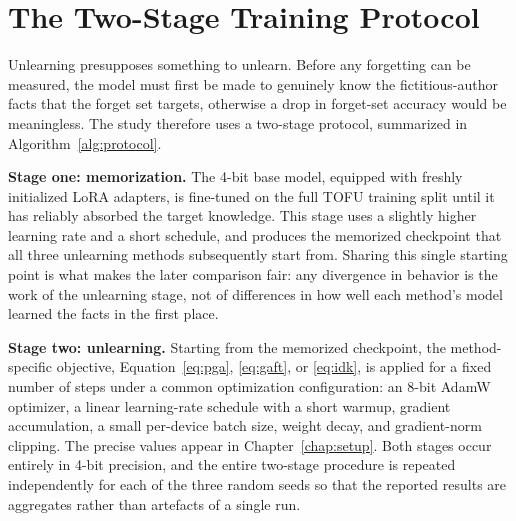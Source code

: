 \documentclass[a4paper,12pt]{report}
\begin{document}
\section{The Two-Stage Training Protocol}
Unlearning presupposes something to unlearn. Before any forgetting can be measured, the model must first be made to genuinely know the fictitious-author facts that the forget set targets, otherwise a drop in forget-set accuracy would be meaningless. The study therefore uses a two-stage protocol, summarized in Algorithm~\ref{alg:protocol}.

\textbf{Stage one: memorization.} The 4-bit base model, equipped with freshly initialized LoRA adapters, is fine-tuned on the full TOFU training split until it has reliably absorbed the target knowledge. This stage uses a slightly higher learning rate and a short schedule, and produces the memorized checkpoint that all three unlearning methods subsequently start from. Sharing this single starting point is what makes the later comparison fair: any divergence in behavior is the work of the unlearning stage, not of differences in how well each method's model learned the facts in the first place.

\textbf{Stage two: unlearning.} Starting from the memorized checkpoint, the method-specific objective, Equation~\eqref{eq:pga}, \eqref{eq:gaft}, or \eqref{eq:idk}, is applied for a fixed number of steps under a common optimization configuration: an 8-bit AdamW optimizer, a linear learning-rate schedule with a short warmup, gradient accumulation, a small per-device batch size, weight decay, and gradient-norm clipping. The precise values appear in Chapter~\ref{chap:setup}. Both stages occur entirely in 4-bit precision, and the entire two-stage procedure is repeated independently for each of the three random seeds so that the reported results are aggregates rather than artefacts of a single run.

\begin{algorithm}[htbp]
	\DontPrintSemicolon
	\SetAlgoLined
	\caption{Two-stage memorize-then-unlearn protocol, repeated per seed.}
	\label{alg:protocol}
\end{algorithm}
\end{document}
